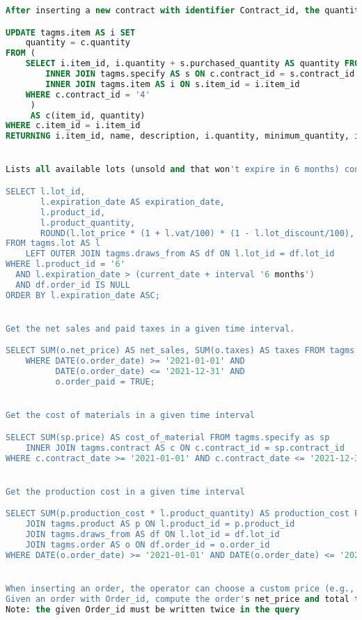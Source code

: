 \begin{lstlisting}[language=SQL,
keywordstyle=\color{blue},
stringstyle=\color{mauve},
showstringspaces=false,
basicstyle=\ttfamily\footnotesize]
After inserting a new contract with identifier Contract_id, the quantities of items in stock must be incremented in the delivery date.

UPDATE tagms.item AS i SET
    quantity = c.quantity
FROM (
    SELECT i.item_id, i.quantity + s.purchased_quantity AS quantity FROM tagms.contract AS c
        INNER JOIN tagms.specify AS s ON c.contract_id = s.contract_id
        INNER JOIN tagms.item AS i ON s.item_id = i.item_id
    WHERE c.contract_id = '4'
     )
     AS c(item_id, quantity)
WHERE c.item_id = i.item_id
RETURNING i.item_id, name, description, i.quantity, minimum_quantity, item_category_id;


Lists all available lots (unsold and that won't expire in 6 months) containing a particular product having a given Product\_id as identifier, sorted by expiration date (oldest lots must be sold first).

SELECT l.lot_id,
       l.expiration_date AS expiration_date,
       l.product_id,
       l.product_quantity,
       ROUND(l.lot_price * (1 + l.vat/100) * (1 - l.lot_discount/100), 2) AS gross_price
FROM tagms.lot AS l
    LEFT OUTER JOIN tagms.draws_from AS df ON l.lot_id = df.lot_id
WHERE l.product_id = '6'
  AND l.expiration_date > (current_date + interval '6 months')
  AND df.order_id IS NULL
ORDER BY l.expiration_date ASC;


Get the net sales and paid taxes in a given time interval.

SELECT SUM(o.net_price) AS net_sales, SUM(o.taxes) AS taxes FROM tagms.order AS o
    WHERE DATE(o.order_date) >= '2021-01-01' AND
          DATE(o.order_date) <= '2021-12-31' AND
          o.order_paid = TRUE;


Get the cost of materials in a given time interval

SELECT SUM(sp.price) AS cost_of_material FROM tagms.specify as sp
    INNER JOIN tagms.contract AS c ON c.contract_id = sp.contract_id
WHERE c.contract_date >= '2021-01-01' AND c.contract_date <= '2021-12-31';


Get the production cost in a given time interval

SELECT SUM(p.production_cost * l.product_quantity) AS production_cost FROM tagms.lot AS l
    JOIN tagms.product AS p ON l.product_id = p.product_id
    JOIN tagms.draws_from AS df ON l.lot_id = df.lot_id
    JOIN tagms.order AS o ON df.order_id = o.order_id
WHERE DATE(o.order_date) >= '2021-01-01' AND DATE(o.order_date) <= '2021-12-31';


When inserting an order, the operator can choose a custom price (e.g., decided with the customer) or use the following query.
Given an order with Order_id, compute the order's net_price and total taxes.
Note: the given Order_id must be written twice in the query


\end{lstlisting}
